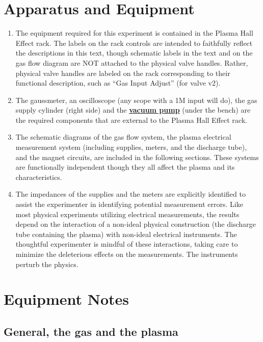 \documentclass{../lab}
\begin{document}
\section{Apparatus and Equipment}

\begin{enumerate}
    \item The equipment required for this experiment is contained in the Plasma Hall Effect rack. The labels on the rack controls are intended to faithfully reflect the descriptions in this text, though schematic labels in the text and on the gas flow diagram are NOT attached to the physical valve handles. Rather, physical valve handles are labeled on the rack corresponding to their functional description, such as ``Gas Input Adjust'' (for valve v2).

    \item The gaussmeter, an oscilloscope (any scope with a 1M input will do), the gas supply cylinder (right side) and the \href{https://drive.google.com/file/d/1aOALhmnip3ygqk_ChEeFxQ-Qq7xVtZBt/view?usp=drive_link}{\textbf{vacuum pump}} (under the bench) are the required components that are external to the Plasma Hall Effect rack.

    \item The schematic diagrams of the gas flow system, the plasma electrical measurement system (including supplies, meters, and the discharge tube), and the magnet circuits, are included in the following sections. These systems are functionally independent though they all affect the plasma and its characteristics.

    \item The impedances of the supplies and the meters are explicitly identified to assist the experimenter in identifying potential measurement errors. Like most physical experiments utilizing electrical measurements, the results depend on the interaction of a non-ideal physical construction (the discharge tube containing the plasma) with non-ideal electrical instruments. The thoughtful experimenter is mindful of these interactions, taking care to minimize the deleterious effects on the measurements. The instruments perturb the physics.

\end{enumerate}

\section{Equipment Notes}

\subsection{General, the gas and the plasma}
\end{document}
